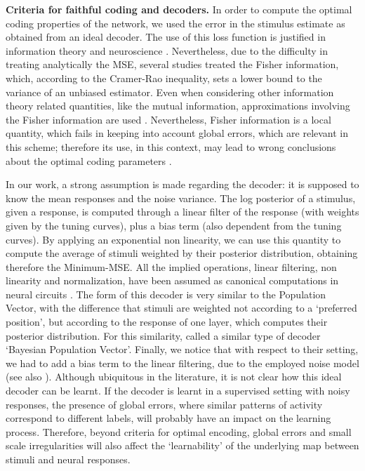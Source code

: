 \documentclass[a4paper]{article}%
\begin{document}
\textbf{Criteria for faithful coding and decoders.} In order to compute the
optimal coding properties of the network, we used the error in the stimulus
estimate as obtained from an ideal decoder. The use of this loss function is
justified in information theory \cite{Cover2005ElementsTheory} and
neuroscience \cite{Dayan2001TheoreticalSystems, Salinas1994VectorRates}.
Nevertheless, due to the difficulty in treating analytically the MSE, several
studies treated the Fisher information, which, according to the Cramer-Rao
inequality, sets a lower bound to the variance of an unbiased estimator. Even
when considering other information theory related quantities, like the mutual
information, approximations involving the Fisher information are used
\cite{Brunel1998MutualCoding,Wei2016MutualCoding,Huang2019ApproximationsCoding}%
. Nevertheless, Fisher information is a local quantity, which fails in keeping
into account global errors, which are relevant in this scheme; therefore its
use, in this context, may lead to wrong conclusions about the optimal coding
parameters
\cite{Bethge2002OptimalFails,Berens2011ReassessingFunctions,Yaeli2010Error-basedNeurons}%
.

In our work, a strong assumption is made regarding the decoder: it is supposed
to know the mean responses and the noise variance. The log posterior of a
stimulus, given a response, is computed through a linear filter of the
response (with weights given by the tuning curves), plus a bias term (also
dependent from the tuning curves). By applying an exponential non linearity,
we can use this quantity to compute the average of stimuli weighted by their
posterior distribution, obtaining therefore the Minimum-MSE. All the implied
operations, linear filtering, non linearity and normalization, have been
assumed as canonical computations in neural circuits
\cite{Deneve1999ReadingObservers,Carandini2012NormalizationComputation,Kouh2008AOperations}%
. The form of this decoder is very similar to the Population Vector, with the
difference that stimuli are weighted not according to a `preferred position',
but according to the response of one layer, which computes their posterior
distribution. For this similarity, \cite{Ganguli2014EfficientPopulations}
called a similar type of decoder `Bayesian Population Vector'. Finally, we
notice that with respect to their setting, we had to add a bias term to the
linear filtering, due to the employed noise model (see also
\cite{Ma2006BayesianCodes,Jazayeri2006OptimalPopulations}). Although
ubiquitous in the literature, it is not clear how this ideal decoder can be
learnt. If the decoder is learnt in a supervised setting with noisy responses,
the presence of global errors, where similar patterns of activity correspond
to different labels, will probably have an impact on the learning process.
Therefore, beyond criteria for optimal encoding, global errors and small scale
irregularities will also affect the `learnability' of the underlying map
between stimuli and neural responses.
\end{document}
